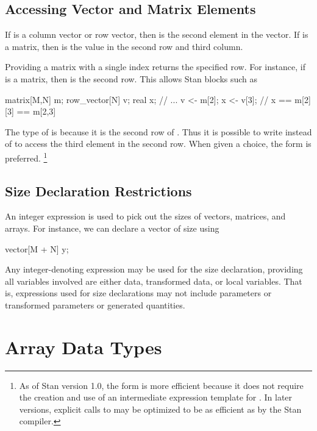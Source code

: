 \subsection{Accessing Vector and Matrix Elements}

If  is a column vector or row vector, then  is the
second element in the vector.  If  is a matrix, then
 is the value in the second row and third column.

Providing a matrix with a single index returns the specified row.  For
instance, if  is a matrix, then  is the second row.
This allows Stan blocks such as
%
\begin{stancode}
matrix[M,N] m;
row_vector[N] v;
real x;
// ...
v <- m[2];
x <- v[3];   // x == m[2][3] == m[2,3]
\end{stancode}
%
The type of  is  because it is the second
row of .  Thus it is possible to write  instead
of  to access the third element in the second row.  When
given a choice, the form  is preferred.%
%
\footnote{As of Stan version 1.0, the form
   is more efficient because it does not require the
  creation and use of an intermediate expression template for
  .  In later versions, explicit calls to 
  may be optimized to be as efficient as  by the Stan
  compiler.\label{array-index-style.footnote}}


\subsection{Size Declaration Restrictions}

An integer expression is used to pick out the sizes of vectors,
matrices, and arrays.  For instance, we can declare a vector of size
 using
%
\begin{stancode}
vector[M + N] y;
\end{stancode}
%
Any integer-denoting expression may be used for the size declaration,
providing all variables involved are either data, transformed data, or
local variables.  That is, expressions used for size declarations may
not include parameters or transformed parameters or generated
quantities.

\section{Array Data Types}\label{array-data-types.section}


